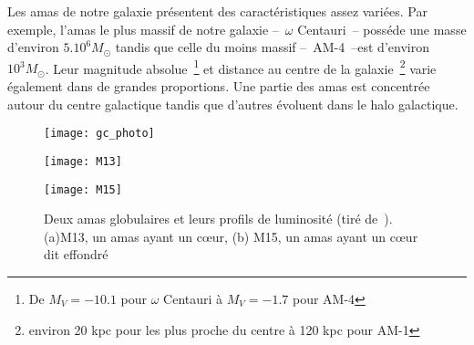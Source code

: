 	Les amas de notre galaxie présentent des caractéristiques assez variées. Par exemple, l'amas le plus massif de notre galaxie --~$\omega$ Centauri~-- posséde une masse d'environ $5.10^6 M_\odot$
	tandis que celle du moins massif --~AM-4~--est d'environ $10^3 M_\odot$.
	Leur magnitude absolue~\footnote{De $M_V = -10.1$ pour $\omega$ Centauri à $M_V = -1.7$ pour AM-4} et distance au centre de la galaxie~\footnote{environ 20 kpc pour les plus proche du centre à 120 kpc pour AM-1} varie également dans de grandes proportions.
	Une partie des amas est concentrée autour du centre galactique tandis que d'autres évoluent dans le halo galactique.



	\begin{figure}
		\begin{center}
			\texttt{[image: gc\_photo]}
		\end{center}
		\begin{minipage}{0.45\textwidth}
		\begin{center}
			\texttt{[image: M13]}
		\end{center}
		\end{minipage}\hfill
		\begin{minipage}{0.45\textwidth}
		\begin{center}
			\texttt{[image: M15]}
		\end{center}
		\end{minipage}
		\caption{Deux amas globulaires et leurs profils de luminosité (tiré de~\cite{2010A&A...522A..71J}). (a)M13, un amas ayant un cœur, (b) M15, un amas ayant un cœur dit effondré}
	\end{figure}

